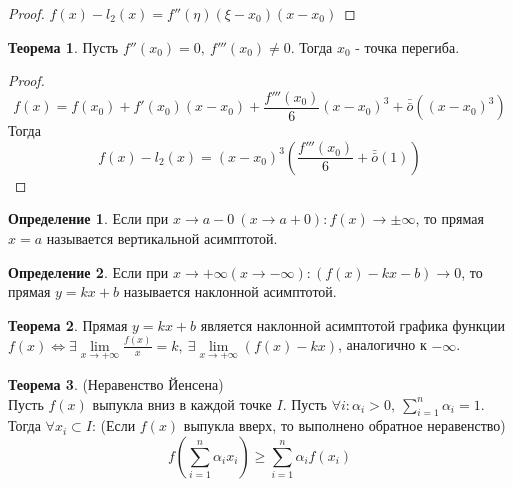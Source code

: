 \documentclass[a4paper, 12pt]{article}
\theoremstyle{definition}
\newtheorem*{definition}{Определение}
\newtheorem*{theorem}{Теорема}
\begin{document}
        \begin{proof}
            $f(x)-l_2(x)=f''(\eta)(\xi-x_0)(x-x_0)$
        \end{proof} 
        \begin{theorem}
            Пусть $f''(x_0)=0,\ f'''(x_0)\ne 0$. Тогда $x_0$ - точка перегиба.
        \end{theorem} 
        \begin{proof}
            \[f(x)=f(x_0)+f'(x_0)(x-x_0)+\frac{f'''(x_0)}{6}(x-x_0)^3+\bar{\bar{o}}{((x-x_0)^3)}\] 
            Тогда
            \[f(x)-l_2(x)=(x-x_0)^3(\frac{f'''(x_0)}{6}+\bar{\bar{o}}{(1)})\]
        \end{proof} 
        \begin{definition}
            Если при $x\to a-0\ (x\to a+0): f(x)\to \pm \infty$, то прямая $x=a$ называется вертикальной асимптотой.
        \end{definition} 
        \begin{definition}
            Если при $x\to +\infty (x\to -\infty): (f(x)-kx-b)\to 0$, то прямая $y=kx+b$ называется наклонной асимптотой.
        \end{definition} 
        \begin{theorem}
            Прямая $y=kx+b$ является наклонной асимптотой графика функции $f(x) \Leftrightarrow \exists \lim\limits_{x\to +\infty}\frac{f(x)}{x}=k,\ \exists \lim\limits_{x\to +\infty}(f(x)-kx)$, аналогично к $-\infty$.
        \end{theorem} 
        \begin{theorem} (Неравенство Йенсена)\\
            Пусть $f(x)$ выпукла вниз в каждой точке $I$. Пусть $\forall i: \alpha_i>0,\ \sum\limits_{i=1}^{n}\alpha_i=1$. Тогда $\forall x_i \subset I$: (Если $f(x)$ выпукла вверх, то выполнено обратное неравенство)
            \[f(\sum\limits_{i=1}^{n}\alpha_i x_i) \geq \sum\limits_{i=1}^{n}\alpha_i f(x_i)\]
        \end{theorem} 
\end{document}
